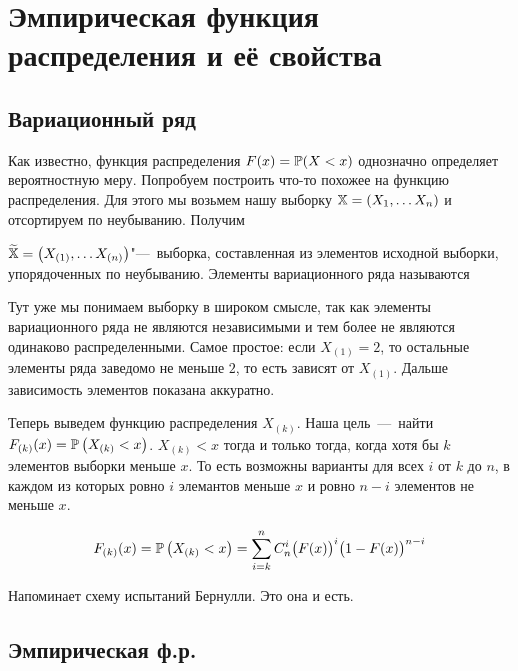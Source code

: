 \documentclass[../TV&MS.tex]{subfiles}
\begin{document}
   
\section{Эмпирическая функция распределения и её свойства}

\subsection{Вариационный ряд}

Как известно, функция распределения $F(x) = \mathbb{P}(X < x)$ однозначно определяет вероятностную меру.
Попробуем построить что-то похожее на функцию распределения.
Для этого мы возьмем нашу выборку $\mathbb{X} = \left( X_1,\ldots X_n \right)$ и отсортируем по неубыванию.
Получим

\begin{Def}
     $\widetilde{\mathbb{X}} = \left( X_{(1)},\ldots X_{(n)} \right)$"---~выборка, составленная из элементов исходной выборки, упорядоченных по неубыванию.
    Элементы вариационного ряда называются 
\end{Def}

\begin{Note}
    Тут уже мы понимаем выборку в широком смысле, так как элементы вариационного ряда не являются независимыми и тем более не являются одинаково распределенными.
    Самое простое: если $X_{(1)} = 2$, то остальные элементы ряда заведомо не меньше $2$, то есть зависят от $X_{(1)}$. Дальше зависимость элементов показана аккуратно.
\end{Note} 

Теперь выведем функцию распределения $X_{(k)}$.
Наша цель~---~найти $F_{(k)}(x) = \mathbb{P}\left(X_{(k)} < x\right)$.
$X_{(k)} < x$ тогда и только тогда, когда хотя бы $k$ элементов выборки меньше $x$.
То есть возможны варианты для всех $i$ от $k$ до $n$, в каждом из которых ровно $i$ элемантов меньше $x$ и ровно $n-i$ элементов не меньше $x$.

\begin{equation}
    F_{(k)}(x) = \mathbb{P}\left( X_{(k)} < x \right) = 
    \sum\limits_{i=k}^{n} C_n^{i} \bigl( F(x) \bigr)^i \bigl( 1 - F(x) \bigr)^{n-i}
\end{equation} 

Напоминает схему испытаний Бернулли. Это она и есть.

\subsection{Эмпирическая ф.р.}
\end{document}
